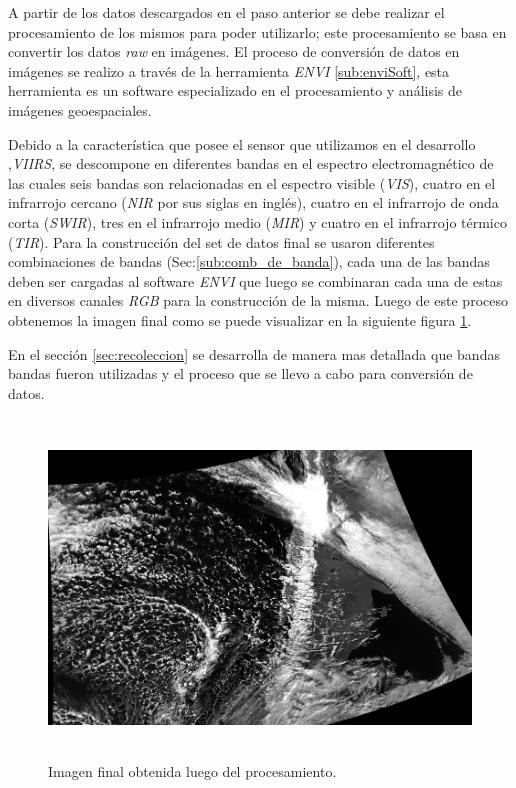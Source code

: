 A partir de los datos descargados en el paso anterior se debe realizar el procesamiento de los mismos para poder utilizarlo; este procesamiento se basa en convertir los datos \textit{raw} en imágenes. El proceso de conversión de datos en imágenes se realizo a través de la herramienta \textit{ENVI} \ref{sub:enviSoft}, esta herramienta es un software  especializado en el procesamiento y análisis de imágenes  geoespaciales.

Debido a la característica que posee el sensor que utilizamos en el desarrollo ,\textit{VIIRS}, se descompone en diferentes bandas en el espectro electromagnético de las cuales seis bandas son relacionadas en el espectro visible (\textit{VIS}), cuatro en el infrarrojo cercano (\textit{NIR} por sus siglas en inglés), cuatro en el infrarrojo de onda corta (\textit{SWIR}), tres en el infrarrojo medio (\textit{MIR}) y cuatro en el infrarrojo térmico (\textit{TIR}). Para la construcción del set de datos final se usaron diferentes combinaciones de bandas (Sec:\ref{sub:comb_de_banda}), cada una de las bandas deben ser cargadas al software \textit{ENVI} que luego se combinaran cada una de estas en diversos canales \textit{RGB} para la construcción de la misma. Luego de este proceso obtenemos la imagen final como se puede visualizar en la siguiente figura \ref{Fig:img-final}.

En el sección \ref{sec:recoleccion} se desarrolla de manera mas detallada que bandas bandas fueron utilizadas y el proceso que se llevo a cabo para conversión de datos.

\begin{figure}[H] \centering
  \includegraphics[height=9cm,keepaspectratio=true,clip=true]{imagenes/tbd/pre-img.png}
  \caption{Imagen final obtenida luego del procesamiento.}\label{Fig:img-final}
\end{figure}


